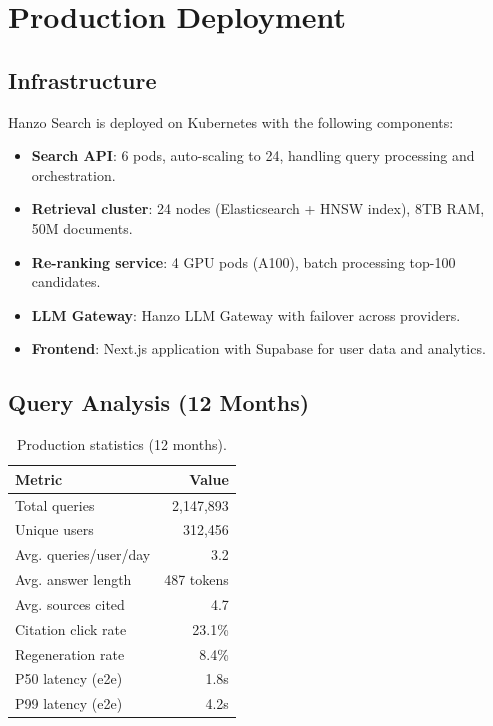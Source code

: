 \section{Production Deployment}

\label{sec:production}

\subsection{Infrastructure}

Hanzo Search is deployed on Kubernetes with the following components:

\begin{itemize}[leftmargin=1.1em]
    \item \textbf{Search API}: 6 pods, auto-scaling to 24, handling query processing and orchestration.
    \item \textbf{Retrieval cluster}: 24 nodes (Elasticsearch + HNSW index), 8TB RAM, 50M documents.
    \item \textbf{Re-ranking service}: 4 GPU pods (A100), batch processing top-100 candidates.
    \item \textbf{LLM Gateway}: Hanzo LLM Gateway with failover across providers.
    \item \textbf{Frontend}: Next.js application with Supabase for user data and analytics.
\end{itemize}

\subsection{Query Analysis (12 Months)}

\begin{table}[H]
\centering
\begin{tabular}{lr}
\toprule
\textbf{Metric} & \textbf{Value} \\
\midrule
Total queries & 2,147,893 \\
Unique users & 312,456 \\
Avg. queries/user/day & 3.2 \\
Avg. answer length & 487 tokens \\
Avg. sources cited & 4.7 \\
Citation click rate & 23.1\% \\
Regeneration rate & 8.4\% \\
P50 latency (e2e) & 1.8s \\
P99 latency (e2e) & 4.2s \\
\bottomrule
\end{tabular}
\caption{Production statistics (12 months).}
\label{tab:prod_stats}
\end{table}

